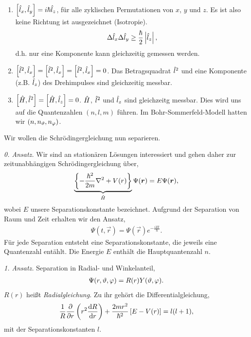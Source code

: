 \begin{bemn}
\begin{enumerate}[label=\arabic{*}.)]
  \item $\left[\hat{\boldmath{l}}_x,\hat{\boldmath{l}}_y\right] = i\hbar \hat{\boldmath{l}}_z$, 
  für alle zyklischen Permutationen von $x$, $y$ und $z$. Es ist also keine
  Richtung ist ausgezeichnet (Isotropie).
\begin{align*}
\Delta \hat{\boldmath{l}}_x \Delta \hat{\boldmath{l}}_y \ge \frac{\hbar}{2}\left|\hat{\boldmath{l}}_z\right|,
\end{align*}
d.h. nur eine Komponente kann gleichzeitig gemessen werden.
\item
$\left[\hat{\boldmath{l}}^2,\hat{\boldmath{l}}_x\right]=\left[\hat{\boldmath{l}}^2,\hat{\boldmath{l}}_x\right]=\left[\hat{\boldmath{l}}^2,\hat{\boldmath{l}}_x\right]=0$.
Das Betragsquadrat $\hat{\boldmath{l}}^2$ und eine Komponente (z.B. $\hat{\boldmath{l}}_z$) des
Drehimpulses sind gleichzeitig messbar.
\item $\left[\hat{\boldmath{H}},\hat{\boldmath{l}}^2\right]=\left[\hat{\boldmath{H}},\hat{\boldmath{l}}_z\right] = 0$. $\hat{\boldmath{H}}$,
$\hat{\boldmath{l}}^2$ und $\hat{\boldmath{l}}_z$ sind gleichzeitg messbar. Dies wird uns auf die
Quantenzahlen $(n,l,m)$ führen. Im Bohr-Sommerfeld-Modell hatten wir
$(n,n_\vartheta,n_\varphi)$.\maphere
\end{enumerate}
\end{bemn}
Wir wollen die Schrödingergleichung nun separieren.

\textit{0. Ansatz.} Wir sind an stationären Lösungen interessiert und gehen
daher zur zeitunabhängigen Schrödingergleichung über,
\begin{align*}
\underbrace{\left\{-\frac{\hbar^2}{2m}\nabla^2 + V(r)\right\}}_{\hat{\boldmath{H}}}\Psi(\bm{r})
= E\Psi(\bm{r}),
\end{align*}
wobei $E$ unsere Separationskonstante bezeichnet. Aufgrund der Separation von
Raum und Zeit erhalten wir den Ansatz,
\begin{align*}
\Psi(t,\vec{r}) = \Psi(\vec{r})e^{-\frac{iEt}{\hbar}}.
\end{align*}
Für jede Separation entsteht eine Separationskonstante, die jeweils eine
Quantenzahl entählt. Die Energie $E$ enthält die Hauptquantenzahl $n$.

\textit{1. Ansatz.} Separation in Radial- und Winkelanteil,
\begin{align*}
\Psi(r,\vartheta,\varphi) = R(r)Y(\vartheta,\varphi).
\end{align*}
$R(r)$ heißt \emph{Radialgleichung}. Zu ihr gehört die Differentialgleichung,
\begin{align*}
\frac{1}{R}\frac{\partial}{\partial r}\left(r^2 \frac{\mathrm{d} R}{\,\mathrm{d} r\,}\right) +
\frac{2mr^2}{\hbar^2}\left[E-V(r)\right] = l(l+1),
\end{align*}
mit der Separationskonstanten $l$.

